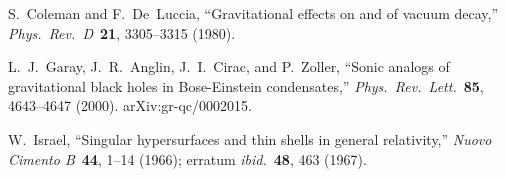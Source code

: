 S.~Coleman and F.~De~Luccia, ``Gravitational effects on and of vacuum decay,'' \emph{Phys.\ Rev.\ D}\ \textbf{21}, 3305--3315 (1980).

L.~J.~Garay, J.~R.~Anglin, J.~I.~Cirac, and P.~Zoller, ``Sonic analogs of gravitational black holes in Bose-Einstein condensates,'' \emph{Phys.\ Rev.\ Lett.}\ \textbf{85}, 4643--4647 (2000). arXiv:gr-qc/0002015.

W.~Israel, ``Singular hypersurfaces and thin shells in general relativity,'' \emph{Nuovo Cimento B}\ \textbf{44}, 1--14 (1966); erratum \emph{ibid.}\ \textbf{48}, 463 (1967).

